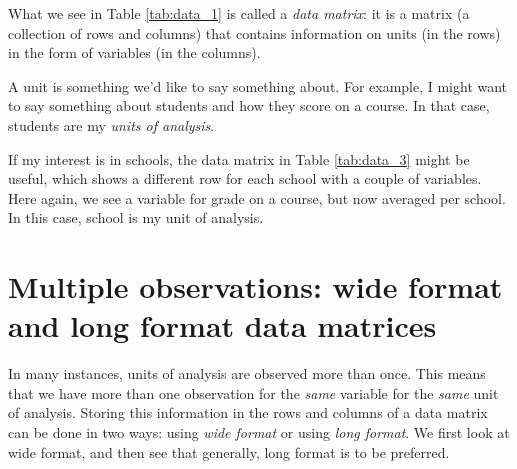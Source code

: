 What we see in Table \ref{tab:data_1} is called a \textit{data matrix}: it is a matrix (a collection of rows and columns) that contains information on units (in the rows) in the form of variables (in the columns).

A unit is something we'd like to say something about. For example, I might want to say something about students and how they score on a course. In that case, students are my \textit{units of analysis}.

%

If my interest is in schools, the data matrix in Table \ref{tab:data_3} might be useful, which shows a different row for each school with a couple of variables. Here again, we see a variable for grade on a course, but now averaged per school. In this case, school is my unit of analysis.

\begin{kframe}


{\ttfamily\noindent\bfseries{}}

{\ttfamily\noindent\bfseries{}}\end{kframe}


\section{Multiple observations: wide format and long format data matrices}

In many instances, units of analysis are observed more than once. This means that we have more than one observation for the \textit{same} variable for the \textit{same} unit of analysis. Storing this information in the rows and columns of a data matrix can be done in two ways: using \textit{wide format} or using \textit{long format}. We first look at wide format, and then see that generally, long format is to be preferred.

